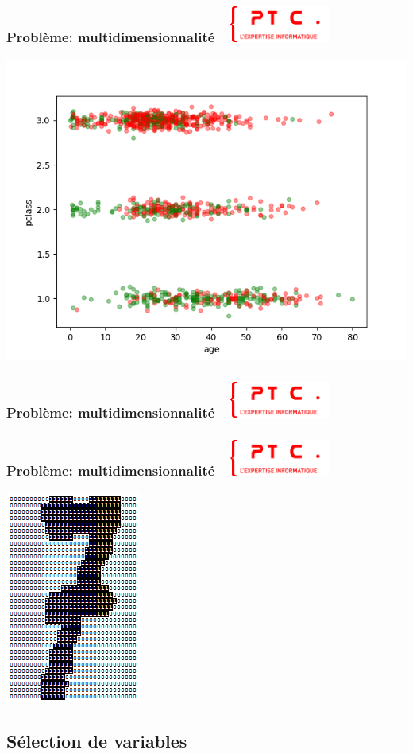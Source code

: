 \documentclass[11pt]{beamer}
\newenvironment{slide}[1]{%
\begin{frame}[environment=slide]
\frametitle{#1~\hfill~\includegraphics[height=1.2cm]{./epitech.png}}
}{%
\end{frame}
}
\begin{document}
\begin{slide}{Problème: multidimensionnalité}
\begin{center}
\includegraphics[scale=0.4]{titanic_plot}
\end{center}
\end{slide}

\begin{slide}{Problème: multidimensionnalité}
\begin{center}
{\tiny }
\end{center}
\end{slide}

\begin{slide}{Problème: multidimensionnalité}
\begin{center}
\includegraphics[scale=.75]{optdigits-7}
\end{center}
\end{slide}

\subsection*{Sélection de variables}
\end{document}
